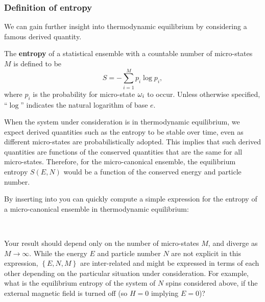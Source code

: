 \subsubsection{Definition of entropy}
We can gain further insight into thermodynamic equilibrium by considering a famous derived quantity.
\begin{shaded}
  The \textbf{entropy} of a statistical ensemble \Om with a countable number of micro-states $M$ is defined to be
  \begin{equation}
    \label{eq:entropy}
    S = - \sum_{i = 1}^M p_i \log p_i,
  \end{equation}
  where $p_i$ is the probability for micro-state $\omega_i$ to occur.
  Unless otherwise specified, ``$\log$'' indicates the natural logarithm of base $e$.
\end{shaded}

When the system under consideration is in thermodynamic equilibrium, we expect derived quantities such as the entropy to be stable over time, even as different micro-states are probabilistically adopted.
This implies that such derived quantities are functions of the conserved quantities that are the same for all micro-states.
Therefore, for the micro-canonical ensemble, the equilibrium entropy $S(E, N)$ would be a function of the conserved energy and particle number.

By inserting  into  you can quickly compute a simple expression for the entropy of a micro-canonical ensemble in thermodynamic equilibrium:
\begin{mdframed}
  \ \\[50 pt]
\end{mdframed}
Your result should depend only on the number of micro-states $M$, and diverge as $M \to \infty$.
While the energy $E$ and particle number $N$ are not explicit in this expression, $\left\{E, N, M\right\}$ are inter-related and might be expressed in terms of each other depending on the particular situation under consideration.
For example, what is the equilibrium entropy of the system of $N$ spins considered above, if the external magnetic field is turned off (so $H = 0$ implying $E = 0$)?
\begin{mdframed}
  \ \\[100 pt]
\end{mdframed}



